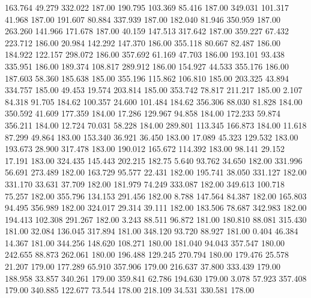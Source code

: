  163.764   49.279  332.022       187.00
 190.795  103.369   85.416       187.00
 349.031  101.317   41.968       187.00
 191.607   80.884  337.939       187.00
 182.040   81.946  350.959       187.00
 263.260  141.966  171.678       187.00
  40.159  147.513  317.642       187.00
 359.227   67.432  223.712       186.00
  20.984  142.292  147.370       186.00
 355.118   80.667   82.487       186.00
 184.922  122.157  298.072       186.00
 357.692   61.169   47.703       186.00
 193.101   93.438  335.951       186.00
 189.374  108.817  289.912       186.00
 154.927   44.533  355.176       186.00
 187.603   58.360  185.638       185.00
 355.196  115.862  106.810       185.00
 203.325   43.894  334.757       185.00
  49.453   19.574  203.814       185.00
 353.742   78.817  211.217       185.00
   2.107   84.318   91.705       184.62
 100.357   24.600  101.484       184.62
 356.306   88.030   81.828       184.00
 350.592   41.609  177.359       184.00
  17.286  129.967   94.858       184.00
 172.233   59.874  356.211       184.00
  12.724   70.031   58.228       184.00
 289.801  113.345  166.873       184.00
  11.618   87.299   49.864       183.00
 153.340   36.921   36.450       183.00
  17.089   45.323  129.532       183.00
 193.673   28.900  317.478       183.00
 190.012  165.672  114.392       183.00
  98.141   29.152   17.191       183.00
 324.435  145.443  202.215       182.75
   5.640   93.762   34.650       182.00
 331.996   56.691  273.489       182.00
 163.729   95.577   22.431       182.00
 195.741   38.050  331.127       182.00
 331.170   33.631   37.709       182.00
 181.979   74.249  333.087       182.00
 349.613  100.718   75.257       182.00
 355.796  134.153  291.456       182.00
   8.788  147.564   84.387       182.00
 165.803   94.495  356.989       182.00
 324.017   29.314   39.111       182.00
 183.506   78.687  342.983       182.00
 194.413  102.308  291.267       182.00
   3.243   88.511   96.872       181.00
 180.810   88.081  315.430       181.00
  32.084  136.045  317.894       181.00
 348.120   93.720   88.927       181.00
   0.404   46.384   14.367       181.00
 344.256  148.620  108.271       180.00
 181.040   94.043  357.547       180.00
 242.655   88.873  262.061       180.00
 196.488  129.245  270.794       180.00
 179.476   25.578   21.207       179.00
 177.289   65.910  357.906       179.00
 216.637   37.800  333.439       179.00
 188.958   33.857  340.261       179.00
 359.841   62.786  194.630       179.00
   3.078   57.923  357.408       179.00
 340.885  122.677   73.544       178.00
 218.109   34.531  330.581       178.00
